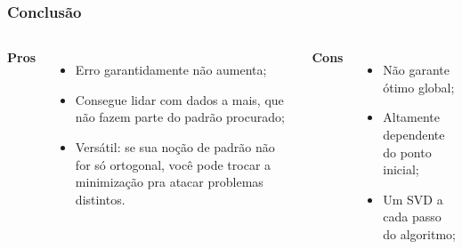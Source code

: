 \begin{frame}
  \frametitle{Conclusão}
  \begin{columns}
    \textbf{Pros}
    \begin{itemize}
      \item Erro garantidamente não aumenta;
      \item Consegue lidar com dados a mais, que não fazem parte do padrão procurado;
      \item Versátil: se sua noção de padrão não for só ortogonal, você pode trocar a minimização pra atacar problemas distintos.
    \end{itemize}
    \textbf{Cons}
    \begin{itemize}
      \item Não garante ótimo global;
      \item Altamente dependente do ponto inicial;
      \item Um SVD a cada passo do algoritmo;
    \end{itemize}
  \end{columns}
\end{frame}

